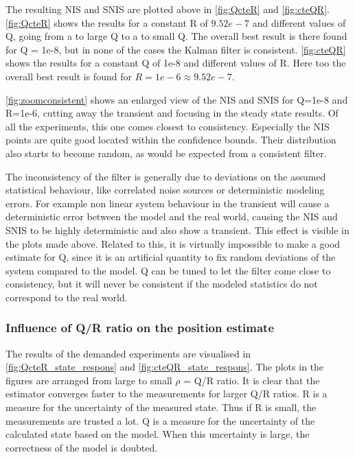 \documentclass[a4paper]{article}
\newcommand{\newpar}{\vspace{.3cm}\noindent}
\begin{document}
\newpar
The resulting NIS and SNIS are plotted above in \autoref{fig:QcteR} and \autoref{fig:cteQR}. \autoref{fig:QcteR} shows the results for a constant R of $9.52e-7$ and different values of Q, going from a to large Q to a to small Q. The overall best result is there found for Q = 1e-8, but in none of the cases the Kalman filter is consistent. \autoref{fig:cteQR} shows the results for a constant Q of 1e-8 and different values of R. Here too the overall best result is found for $R = 1e-6 \approx 9.52e-7$. 

\newpar
\autoref{fig:zoomconsistent} shows an enlarged view of the NIS and SNIS for Q=1e-8 and R=1e-6, cutting away the transient and focusing in the steady state results. Of all the experiments, this one comes closest to consistency. Especially the NIS points are quite good located within the confidence bounds. Their distribution also starts to become random, as would be expected from a consistent filter.

\newpar
The inconsistency of the filter is generally due to deviations on the assumed statistical behaviour, like correlated noise sources or deterministic modeling errors. For example non linear system behaviour in the transient will cause a deterministic error between the model and the real world, causing the NIS and SNIS to be highly deterministic and also show a transient. This effect is visible in the plots made above. Related to this, it is virtually impossible to make a good estimate for Q, since it is an artificial quantity to fix random deviations of the system compared to the model. Q can be tuned to let the filter come close to consistency, but it will never be consistent if the modeled statistics do not correspond to the real world. 


\subsubsection{Influence of Q/R ratio on the position estimate} \label{Q/R ratio position estimate}
The results of the demanded experiments are visualised in \autoref{fig:QcteR_state_respons} and \autoref{fig:cteQR_state_respons}. The plots in the figures are arranged from large to small $\rho$ = Q/R ratio. It is clear that the estimator converges faster to the measurements for larger Q/R ratios. R is a measure for the uncertainty of the measured state. Thus if R is small, the measurements are trusted a lot. Q is a measure for the uncertainty of the calculated state based on the model. When this uncertainty is large, the correctness of the model is doubted. 
\end{document}
